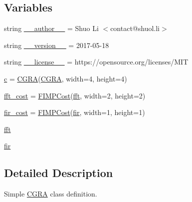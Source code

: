 \subsection*{Variables}
\begin{DoxyCompactItemize}
\item 
string \hyperlink{namespacesylva_1_1base_1_1cgra_a400fee11644a6889b1df14ca47d1edec}{\+\_\+\+\_\+author\+\_\+\+\_\+} = \textquotesingle{}Shuo Li $<$contact@shuol.\+li$>$\textquotesingle{}
\item 
string \hyperlink{namespacesylva_1_1base_1_1cgra_a0004c4ea894491746a782121a2a9938f}{\+\_\+\+\_\+version\+\_\+\+\_\+} = \textquotesingle{}2017-\/05-\/18\textquotesingle{}
\item 
string \hyperlink{namespacesylva_1_1base_1_1cgra_a32231f1ee733f1fe50707e00c4402b27}{\+\_\+\+\_\+license\+\_\+\+\_\+} = \textquotesingle{}https\+://opensource.\+org/licenses/M\+IT\textquotesingle{}
\item 
\hyperlink{namespacesylva_1_1base_1_1cgra_a4a25bc3c469d6472bfebb1c2089476ba}{c} = \hyperlink{classsylva_1_1base_1_1cgra_1_1_c_g_r_a}{C\+G\+RA}(\textquotesingle{}\hyperlink{classsylva_1_1base_1_1cgra_1_1_c_g_r_a}{C\+G\+RA}\textquotesingle{}, width=4, height=4)
\item 
\hyperlink{namespacesylva_1_1base_1_1cgra_adfa9387f3823068327754f28f8419f7b}{fft\+\_\+cost} = \hyperlink{classsylva_1_1base_1_1fimp_1_1_f_i_m_p_cost}{F\+I\+M\+P\+Cost}(\textquotesingle{}\hyperlink{namespacesylva_1_1base_1_1cgra_abc1c6fdee4ec52dc2897a70f342d3df9}{fft}\textquotesingle{}, width=2, height=2)
\item 
\hyperlink{namespacesylva_1_1base_1_1cgra_a5da4792f8f8f7c77821e5ca332f02c21}{fir\+\_\+cost} = \hyperlink{classsylva_1_1base_1_1fimp_1_1_f_i_m_p_cost}{F\+I\+M\+P\+Cost}(\textquotesingle{}\hyperlink{namespacesylva_1_1base_1_1cgra_a6cedc9184872b357ffe3ab9dc7abf09e}{fir}\textquotesingle{}, width=1, height=1)
\item 
\hyperlink{namespacesylva_1_1base_1_1cgra_abc1c6fdee4ec52dc2897a70f342d3df9}{fft}
\item 
\hyperlink{namespacesylva_1_1base_1_1cgra_a6cedc9184872b357ffe3ab9dc7abf09e}{fir}
\end{DoxyCompactItemize}


\subsection{Detailed Description}
Simple \hyperlink{classsylva_1_1base_1_1cgra_1_1_c_g_r_a}{C\+G\+RA} class definition. 

